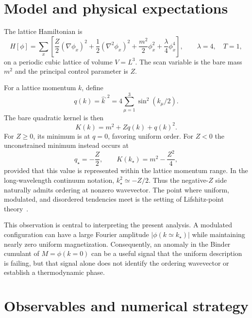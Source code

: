 \documentclass[11pt]{article}
\newcommand{\kstar}{k_\star}
\newcommand{\qstar}{q_\star}
\begin{document}
\section{Model and physical expectations}

The lattice Hamiltonian is
\begin{equation}
  H[\phi] = \sum_x \left[
    \frac{Z}{2}(\nabla\phi_x)^2
    +\frac{1}{2}(\nabla^2\phi_x)^2
    +\frac{m^2}{2}\phi_x^2
    +\frac{\lambda}{4}\phi_x^4
  \right],
  \qquad \lambda=4,\quad T=1,
  \label{eq:hamiltonian}
\end{equation}
on a periodic cubic lattice of volume $V=L^3$.  The scan variable is the bare
mass $m^2$ and the principal control parameter is $Z$.

For a lattice momentum $k$, define
\begin{equation}
  q(k)=\widehat{k}^{,2}=4\sum_{\mu=1}^{3}\sin^2(k_\mu/2).
\end{equation}
The bare quadratic kernel is then
\begin{equation}
  K(k)=m^2+Zq(k)+q(k)^2.
  \label{eq:kernel}
\end{equation}
For $Z\geq0$, its minimum is at $q=0$, favoring uniform order.  For $Z<0$
the unconstrained minimum instead occurs at
\begin{equation}
  \qstar=-\frac{Z}{2}, \qquad
  K(\kstar)=m^2-\frac{Z^2}{4},
  \label{eq:qstar}
\end{equation}
provided that this value is represented within the lattice momentum range.
In the long-wavelength continuum notation, $\kstar^2\simeq -Z/2$.  Thus the
negative-$Z$ side naturally admits ordering at nonzero wavevector.  The point
where uniform, modulated, and disordered tendencies meet is the setting of
Lifshitz-point theory~\cite{Hornreich1975}.

This observation is central to interpreting the present analysis.  A
modulated configuration can have a large Fourier amplitude
$|\phi(k\simeq\kstar)|$ while maintaining nearly zero uniform magnetization.
Consequently, an anomaly in the Binder cumulant of $M=\phi(k=0)$ can be a
useful signal that the uniform description is failing, but that signal alone
does not identify the ordering wavevector or establish a thermodynamic phase.

\section{Observables and numerical strategy}
\end{document}
